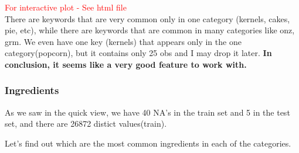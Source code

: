\documentclass[
]{article}
\begin{document}
\textcolor{red}{For interactive plot - See html file}\\
There are keywords that are very common only in one category (kernels,
cakes, pie, etc), while there are keywords that are common in many
categories like onz, grm. We even have one key (kernels) that appears
only in the one category(popcorn), but it contains only 25 obs and I may
drop it later. \textbf{In conclusion, it seems like a very good feature
to work with.}

\hypertarget{ingredients}{%
\subsubsection{Ingredients}\label{ingredients}}

As we saw in the quick view, we have 40 NA's in the train set and 5 in
the test set, and there are 26872 distict values(train).

Let's find out which are the most common ingredients in each of the
categories.
\end{document}
